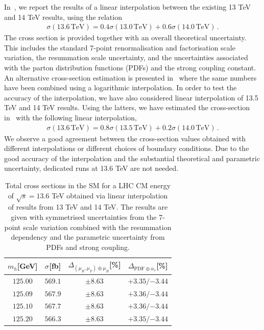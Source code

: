 \documentclass[11pt,a4paper]{article}
\begin{document}
In~, we report the results of a linear interpolation between the existing 13 TeV and 14 TeV results, using the relation
\begin{align}
\sigma(13.6\,\text{TeV})=0.4\sigma(13.0\,\text{TeV})+0.6\sigma(14.0\,\text{TeV})\,.
\end{align}
The cross section is provided together with an overall theoretical uncertainty. This includes the standard 7-point renormalisation and factorisation scale variation, the resummation scale uncertainty, and the uncertainties associated with the parton distribution functions (PDFs) and the strong coupling constant. An alternative cross-section estimation is presented in~ where the same numbers have been combined using a logarithmic interpolation. In order to test the accuracy of the interpolation, we have also considered linear interpolation of 13.5 TeV and 14 TeV results. Using the latters, we have estimated the cross-section in~ with the following linear interpolation,
\begin{align}
	\sigma(13.6\,\text{TeV})=0.8\sigma(13.5\,\text{TeV})+0.2\sigma(14.0\,\text{TeV})\,.
\end{align}
We observe a good agreement between the cross-section values obtained with different interpolations or different choices of boundary conditions. Due to the good accuracy of the interpolation and the substantial theoretical and parametric uncertainty, dedicated runs at 13.6 TeV are not needed.

\begin{table}[ht!]
\begin{center}%
\begin{small}%
\begin{tabular}{cccc}%
$m_h$[GeV] & $\sigma^{}$[fb] & $\Delta_{\left(\mu_{R},\mu_{F}\right)\oplus\mu_{B}}$[\%] & $\Delta_{\mathrm{PDF}\oplus\alpha_s}$[\%]  \\\hline
$125.00$ & $569.1$ & $\pm8.63$ & ${{+3.35}}/{-3.44}$ \\
$125.09$ & $567.9$ & $\pm8.63$ & ${{+3.36}}/{-3.44}$ \\
$125.10$ & $567.7$ & $\pm8.63$ & ${{+3.36}}/{-3.44}$ \\
$125.20$ & $566.3$ & $\pm8.63$ & ${{+3.35}}/{-3.44}$ 
\end{tabular}%
\end{small}%
\end{center}%
\caption{Total \bbH{} cross sections in the SM for a LHC CM energy of $\sqrt{s}=13.6$ TeV obtained via linear interpolation of results from 13 TeV and 14 TeV. The results are given with symmetrised uncertainties from the 7-point scale variation combined with the resummation dependency and the parametric uncertainty from PDFs and strong coupling.}
\label{tab:bbH136lin}
\end{table}
\end{document}
